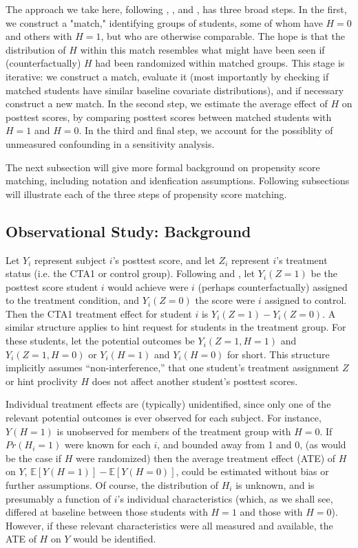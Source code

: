 \documentclass{article}\usepackage[]{graphicx}\usepackage[]{color}
\newcommand{\EE}{\mathbb{E}}
\begin{document}
The approach we take here, following \citet{rosenbaum2002observational},
 \citet{hansen2009b}, and \citet{ho:etal:2007}, has three broad steps.
In the first, we construct a "match," identifying groups of students, some of whom have $H=0$ and others with $H=1$, but who are otherwise comparable.
The hope is that the distribution of $H$ within this match resembles what might have been seen if (counterfactually) $H$ had been randomized within matched groups.
This stage is iterative: we construct a match, evaluate it (most importantly by checking if matched students have similar baseline covariate distributions), and if necessary construct a new match.
In the second step, we estimate the average effect of $H$ on posttest scores, by comparing posttest scores between matched students with $H=1$ and $H=0$.
In the third and final step, we account for the possiblity of unmeasured confounding in a sensitivity analysis.

The next subsection will give more formal background on propensity score matching, including notation and idenfication assumptions. Following subsections will illustrate each of the three steps of propensity score matching.

\subsection{Observational Study: Background}
Let $Y_i$ represent subject $i$'s posttest score, and let $Z_i$ represent
$i$'s treatment status (i.e. the CTA1 or control group).
Following \citet{neyman} and \citet{rubin}, let $Y_i(Z=1)$ be
the posttest score student $i$ would achieve were $i$ (perhaps
counterfactually) assigned to the treatment condition, and
$Y_i(Z=0)$ the score were $i$ assigned to control.
Then the CTA1 treatment effect for student $i$ is $Y_i(Z=1)-Y_i(Z=0)$.
A similar structure applies to hint request for students in the
treatment group.
For these students, let the potential outcomes be $Y_i(Z=1,H=1)$ and
$Y_i(Z=1,H=0)$ or $Y_i(H=1)$ and $Y_i(H=0)$ for short.
This structure implicitly assumes ``non-interference,'' that one
student's treatment assignment $Z$ or hint proclivity $H$ does not
affect another student's posttest scores.

Individual treatment effects are (typically) unidentified, since only
one of the relevant potential outcomes is ever observed for each
subject.
For instance, $Y(H=1)$ is unobserved for members of the
treatment group with $H=0$.
If $Pr(H_i=1)$ were known for each $i$, and bounded away from 1 and 0, (as would be the case if $H$
were randomized) then the average treatment effect (ATE) of $H$ on $Y$,
$\EE[Y(H=1)]-\EE[Y(H=0)]$, could be estimated without bias or further
assumptions.
Of course, the distribution of $H_i$ is unknown, and is presumably a
function of $i$'s individual characteristics (which, as we shall see,
differed at baseline between those students with $H=1$ and those with $H=0$).
However, if these relevant characteristics were all measured and
available, the ATE of $H$ on $Y$ would be identified.
\end{document}
